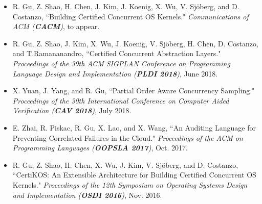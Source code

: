 \documentclass[10pt]{article}
\newenvironment{innerlist}[1][\enskip\textbullet]%
        {\begin{itemize}[#1,leftmargin=25pt,parsep=0pt,itemsep=2pt,topsep=2pt,partopsep=0pt]}
        {\end{itemize}}
\begin{document}
\begin{innerlist}
%
%
%

\item[] R. Gu, Z. Shao, H. Chen, J. Kim, J. Koenig, X. Wu, V. Sj\"{o}berg, and D. Costanzo, ``Building Certified Concurrent OS Kernels." \emph{Communications of ACM (\textbf{CACM})}, to appear.

\vspace{.1in}


\item[] R. Gu, Z. Shao, J. Kim, X. Wu, J. Koenig, V. Sj\"{o}berg, H. Chen, D. Costanzo, and T.Ramananandro, ``Certified Concurrent Abstraction Layers." \emph{Proceedings of the 39th ACM SIGPLAN Conference on Programming Language Design and Implementation (\textbf{PLDI 2018})}, June 2018.

\vspace{.1in}


\item[] X. Yuan, J. Yang, and R. Gu, ``Partial Order Aware Concurrency Sampling."  \emph{Proceedings of the 30th International Conference on Computer Aided Verification (\textbf{CAV 2018})}, July 2018.

%

\vspace{.1in}

\item[] E. Zhai, R. Piskac, R. Gu, X. Lao, and X. Wang, ``An Auditing Language for Preventing Correlated Failures in the Cloud." \emph{Proceedings of the ACM on Programming Languages (\textbf{OOPSLA 2017})}, Oct. 2017.


\vspace{.1in}


\item[] R. Gu, Z. Shao, H. Chen, X. Wu, J. Kim, V. Sj\"{o}berg, and D. Costanzo, ``CertiKOS: An Extensible Architecture for Building Certified Concurrent OS Kernels." \emph{Proceedings of the 12th Symposium on Operating Systems Design and Implementation (\textbf{OSDI 2016})}, Nov. 2016.


\end{innerlist}
\end{document}
